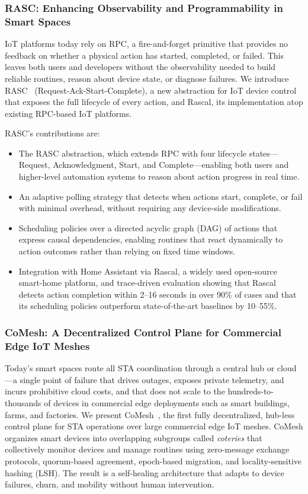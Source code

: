 \subsubsection{RASC: Enhancing Observability and Programmability in Smart Spaces}
\label{intro:sec:rasc}

IoT platforms today rely on RPC, a fire-and-forget primitive that provides no feedback on whether a physical action has started, completed, or failed. This leaves both users and developers without the observability needed to build reliable routines, reason about device state, or diagnose failures. We introduce RASC~\cite{rasc} (Request-Ack-Start-Complete), a new abstraction for IoT device control that exposes the full lifecycle of every action, and Rascal, its implementation atop existing RPC-based IoT platforms.

RASC's contributions are:
\begin{itemize}
    \item The RASC abstraction, which extends RPC with four lifecycle states---Request, Acknowledgment, Start, and Complete---enabling both users and higher-level automation systems to reason about action progress in real time.
    \item An adaptive polling strategy that detects when actions start, complete, or fail with minimal overhead, without requiring any device-side modifications.
    \item Scheduling policies over a directed acyclic graph (DAG) of actions that express causal dependencies, enabling routines that react dynamically to action outcomes rather than relying on fixed time windows.
    \item Integration with Home Assistant via Rascal, a widely used open-source smart-home platform, and trace-driven evaluation showing that Rascal detects action completion within 2--16 seconds in over 90\% of cases and that its scheduling policies outperform state-of-the-art baselines by 10--55\%.
\end{itemize}


\subsubsection{CoMesh: A Decentralized Control Plane for Commercial Edge IoT Meshes}
\label{intro:sec:comesh}

Today's smart spaces route all STA coordination through a central hub or cloud---a single point of failure that drives outages, exposes private telemetry, and incurs prohibitive cloud costs, and that does not scale to the hundreds-to-thousands of devices in commercial edge deployments such as smart buildings, farms, and factories. We present CoMesh~\cite{comesh}, the first fully decentralized, hub-less control plane for STA operations over large commercial edge IoT meshes. CoMesh organizes smart devices into overlapping subgroups called \emph{coteries} that collectively monitor devices and manage routines using zero-message exchange protocols, quorum-based agreement, epoch-based migration, and locality-sensitive hashing (LSH). The result is a self-healing architecture that adapts to device failures, churn, and mobility without human intervention.

